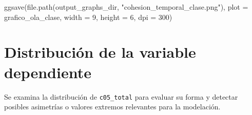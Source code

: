 \documentclass[
  spanish,
  a4paper,
  oneside]{scrbook}
\newenvironment{Shaded}{\begin{snugshade}}{\end{snugshade}}
\newcommand{\AttributeTok}[1]{\textcolor[rgb]{0.40,0.45,0.13}{#1}}
\newcommand{\DecValTok}[1]{\textcolor[rgb]{0.68,0.00,0.00}{#1}}
\newcommand{\FunctionTok}[1]{\textcolor[rgb]{0.28,0.35,0.67}{#1}}
\newcommand{\NormalTok}[1]{\textcolor[rgb]{0.00,0.23,0.31}{#1}}
\newcommand{\StringTok}[1]{\textcolor[rgb]{0.13,0.47,0.30}{#1}}
\begin{document}
\begin{Shaded}
\begin{Highlighting}[]
\FunctionTok{ggsave}\NormalTok{(}\FunctionTok{file.path}\NormalTok{(output\_graphs\_dir, }\StringTok{"cohesion\_temporal\_clase.png"}\NormalTok{),}
       \AttributeTok{plot =}\NormalTok{ grafico\_ola\_clase, }\AttributeTok{width =} \DecValTok{9}\NormalTok{, }\AttributeTok{height =} \DecValTok{6}\NormalTok{, }\AttributeTok{dpi =} \DecValTok{300}\NormalTok{)}
\end{Highlighting}
\end{Shaded}

\section{Distribución de la variable
dependiente}\label{distribuciuxf3n-de-la-variable-dependiente}

Se examina la distribución de \texttt{c05\_total} para evaluar su forma
y detectar posibles asimetrías o valores extremos relevantes para la
modelación.
\end{document}
